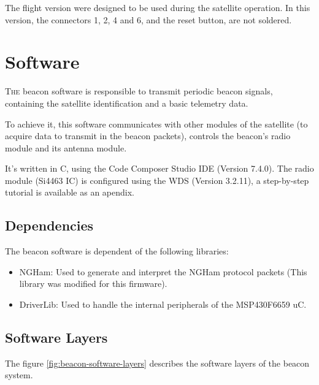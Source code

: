 \documentclass[12pt]{book}
\begin{document}
The flight version were designed to be used during the satellite operation. In this version, the connectors 1, 2, 4 and 6, and the reset button, are not soldered.


\chapter{Software}

\lettrine{T}{he} beacon software is responsible to transmit periodic beacon signals, containing the satellite identification and a basic telemetry data.

To achieve it, this software communicates with other modules of the satellite (to acquire data to transmit in the beacon packets), controls the beacon's radio module and its antenna module.

It's written in C, using the Code Composer Studio IDE (Version 7.4.0). The radio module (Si4463 IC) is configured using the WDS (Version 3.2.11), a step-by-step tutorial is available as an apendix.

\section{Dependencies}

The beacon software is dependent of the following libraries:

\begin{itemize}
    \item NGHam: Used to generate and interpret the NGHam protocol packets (This library was modified for this firmware).
    \item DriverLib: Used to handle the internal peripherals of the MSP430F6659 uC.
\end{itemize}


\section{Software Layers}

The figure \ref{fig:beacon-software-layers} describes the software layers of the beacon system.
\end{document}
